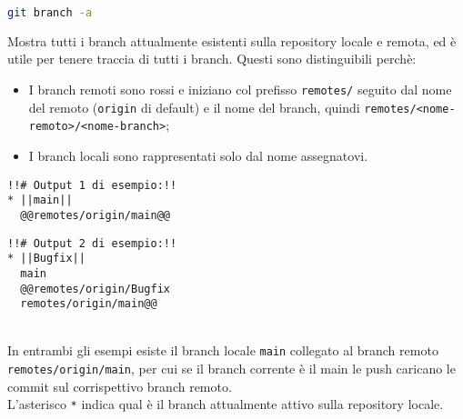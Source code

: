 \begin{lstlisting}[language=bash]
	git branch -a
\end{lstlisting}
Mostra tutti i branch attualmente esistenti sulla repository locale e remota, ed è utile per tenere traccia di tutti i branch. Questi sono distinguibili perchè:
\begin{itemize}[noitemsep, topsep=3pt]
	\item I branch remoti sono rossi e iniziano col prefisso \texttt{remotes/} seguito dal nome del remoto (\texttt{origin} di default) e il nome del branch, quindi \texttt{remotes/<nome-remoto>/<nome-branch>};
	\item I branch locali sono rappresentati solo dal nome assegnatovi.\\
\end{itemize}
\begin{minipage}{.45\textwidth}
\begin{lstlisting}[backgroundcolor=\color{green!5}]
  !!# Output 1 di esempio:!!
* ||main||
  @@remotes/origin/main@@
\end{lstlisting}
\end{minipage}
\hfill
\begin{minipage}{.45\textwidth}
\begin{lstlisting}[backgroundcolor=\color{green!5}]
  !!# Output 2 di esempio:!!
* ||Bugfix||
  main
  @@remotes/origin/Bugfix
  remotes/origin/main@@
\end{lstlisting}
\end{minipage}\\
In entrambi gli esempi esiste il branch locale \texttt{\color{green!60!black}main} collegato al branch remoto \texttt{\color{red}remotes/origin/main}, per cui se il branch corrente è il main le push caricano le commit sul corrispettivo branch remoto.\\
L'asterisco \texttt{*} indica qual è il branch attualmente attivo sulla repository locale.\\

